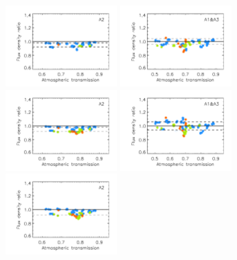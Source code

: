 \begin{figure}[ht!]
\begin{center}
    \includegraphics[clip=true, trim={0.9cm, 0.2cm, 0, 0.6cm},width=0.38\textwidth]{Figures/Calibration/plot_flux_density_ratio_MWC349_obstau_skydip_narrow_a2.pdf}
    \includegraphics[clip=true, trim={0.9cm, 0.2cm, 0, 0.6cm},width=0.38\textwidth]{Figures/Calibration/plot_flux_density_ratio_MWC349_obstau_corrected_skydip_photocorr_demo_narrow_1mm.pdf}
    \includegraphics[clip=true, trim={0.9cm, 0.2cm, 0, 0.6cm},width=0.38\textwidth]{Figures/Calibration/plot_flux_density_ratio_MWC349_obstau_corrected_skydip_photocorr_demo_narrow_a2.pdf}
    \includegraphics[clip=true, trim={0.9cm, 0.2cm, 0, 0.6cm},width=0.38\textwidth]{Figures/Calibration/plot_flux_density_ratio_MWC349_obstau_corrected_skydip_photocorr_pointing_narrow_1mm.pdf}
    \includegraphics[clip=true, trim={0.9cm, 0.2cm, 0, 0.6cm},width=0.38\textwidth]{Figures/Calibration/plot_flux_density_ratio_MWC349_obstau_corrected_skydip_photocorr_pointing_narrow_a2.pdf}

\end{center}
\end{figure}
